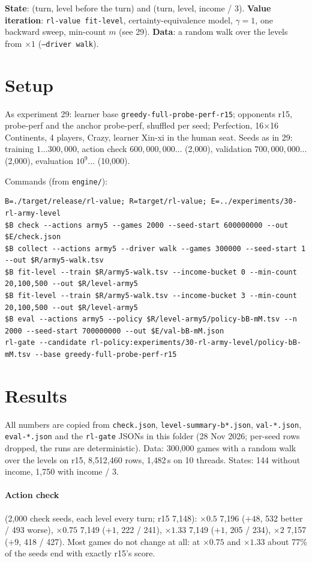 \documentclass{../polyexp}
\begin{document}
\textbf{State}: (turn, level before the turn) and (turn, level, income / 3). \textbf{Value iteration}: \texttt{rl-value
fit-level}, certainty-equivalence model, $\gamma = 1$, one backward sweep, min-count $m$ (see 29). \textbf{Data}: a
random walk over the levels from $\times1$ (\texttt{--driver walk}).

\section{Setup}
As experiment 29: learner base \texttt{greedy-full-probe-perf-r15}; opponents r15, probe-perf and the anchor
probe-perf, shuffled per seed; Perfection, 16$\times$16 Continents, 4 players, Crazy, learner Xin-xi in the human
seat. Seeds as in 29: training $1\dots300{,}000$, action check $600{,}000{,}000\dots$ (2{,}000), validation
$700{,}000{,}000\dots$ (2{,}000), evaluation $10^9\dots$ (10{,}000).

Commands (from \texttt{engine/}):
\begin{verbatim}
B=./target/release/rl-value; R=target/rl-value; E=../experiments/30-rl-army-level
$B check --actions army5 --games 2000 --seed-start 600000000 --out $E/check.json
$B collect --actions army5 --driver walk --games 300000 --seed-start 1 --out $R/army5-walk.tsv
$B fit-level --train $R/army5-walk.tsv --income-bucket 0 --min-count 20,100,500 --out $R/level-army5
$B fit-level --train $R/army5-walk.tsv --income-bucket 3 --min-count 20,100,500 --out $R/level-army5
$B eval --actions army5 --policy $R/level-army5/policy-bB-mM.tsv --n 2000 --seed-start 700000000 --out $E/val-bB-mM.json
rl-gate --candidate rl-policy:experiments/30-rl-army-level/policy-bB-mM.tsv --base greedy-full-probe-perf-r15
\end{verbatim}

\section{Results}
\ExpResults

All numbers are copied from \texttt{check.json}, \texttt{level-summary-b*.json}, \texttt{val-*.json},
\texttt{eval-*.json} and the \texttt{rl-gate} JSONs in this folder (28 Nov 2026; per-seed rows dropped, the runs are
deterministic). Data: 300{,}000 games with a random walk over the levels on r15, 8{,}512{,}460 rows, 1{,}482\,s on
10 threads. States: 144 without income, 1{,}750 with income / 3.

\paragraph{Action check} (2{,}000 check seeds, each level every turn; r15 7{,}148): $\times0.5$ 7{,}196 ($+48$,
532 better / 493 worse), $\times0.75$ 7{,}149 ($+1$, 222 / 241), $\times1.33$ 7{,}149 ($+1$, 205 / 234), $\times2$
7{,}157 ($+9$, 418 / 427). Most games do not change at all: at $\times0.75$ and $\times1.33$ about 77\% of the seeds
end with exactly r15's score.
\end{document}
